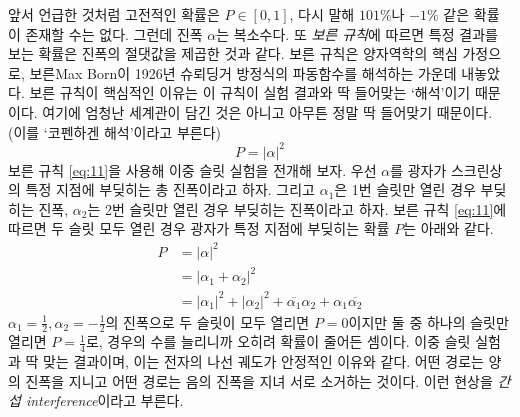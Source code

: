 \documentclass[a4paper,chapter,atbegshi]{oblivoir}
\begin{document}
앞서 언급한 것처럼 고전적인 확률은 $P\in[0,1]$, 다시 말해 $101\%$나 $-1\%$ 같은
확률이 존재할 수는 없다. 그런데 진폭 $\alpha$는 복소수다. 또 \emph{보른 규칙}에
따르면 특정 결과를 보는 확률은 진폭의 절댓값을 제곱한 것과 같다. 보른 규칙은
양자역학의 핵심 가정으로, 보른{\tiny Max Born}이 1926년 슈뢰딩거 방정식의
파동함수를 해석하는 가운데 내놓았다. 보른 규칙이 핵심적인 이유는 이 규칙이
실험 결과와 딱 들어맞는 `해석'이기 때문이다. 여기에 엄청난 세계관이 담긴 것은
아니고 아무튼 정말 딱 들어맞기 때문이다. (이를 `코펜하겐 해석'이라고 부른다)
\begin{equation}\label{eq:11}
P=|\alpha|^2
\end{equation}
보른 규칙 \ref{eq:11}을 사용해 이중 슬릿 실험을 전개해 보자. 우선 $\alpha$를 
광자가 스크린상의 특정 지점에 부딪히는 총 진폭이라고 하자. 그리고 $\alpha_1$은
1번 슬릿만 열린 경우 부딪히는 진폭, $\alpha_2$는 2번 슬릿만 열린 경우 부딪히는
진폭이라고 하자. 보른 규칙 \ref{eq:11}에 따르면 두 슬릿 모두 열린 경우
광자가 특정 지점에 부딪히는 확률 $P$는 아래와 같다.
\begin{align*}
  P &= |\alpha|^2 \\ 
    &= |\alpha_1+\alpha_2|^2 \\ 
    &= |\alpha_1|^2 + |\alpha_2|^2 + \overline{\alpha_1}\alpha_2+\alpha_1\overline{\alpha_2}
\end{align*}
$\alpha_1=\frac{1}{2},\alpha_2=-\frac{1}{2}$의 진폭으로 두 슬릿이 모두 열리면
$P=0$이지만 둘 중 하나의 슬릿만 열리면 $P=\frac{1}{4}$로, 경우의 수를 늘리니까
오히려 확률이 줄어든 셈이다. 이중 슬릿 실험과 딱 맞는 결과이며, 이는 전자의 
나선 궤도가 안정적인 이유와 같다. 어떤 경로는 양의 진폭을 지니고 어떤 경로는
음의 진폭을 지녀 서로 소거하는 것이다. 이런 현상을 \emph{간섭\tiny
interference}이라고 부른다.  
\end{document}
